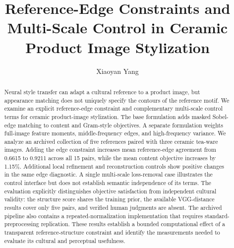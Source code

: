 \documentclass[manuscript,acmlarge,screen,review]{acmart}
\begin{document}
\title{Reference-Edge Constraints and Multi-Scale Control in Ceramic Product Image Stylization}

\author{Xiaoyan Yang}


\begin{abstract}
Neural style transfer can adapt a cultural reference to a product image, but appearance matching does not uniquely specify the contours of the reference motif. We examine an explicit reference-edge constraint and complementary multi-scale control terms for ceramic product-image stylization. The base formulation adds masked Sobel-edge matching to content and Gram-style objectives. A separate formulation weights full-image feature moments, middle-frequency edges, and high-frequency variance. We analyze an archived collection of five references paired with three ceramic tea-ware images. Adding the edge constraint increases mean reference-edge agreement from 0.6615 to 0.9211 across all 15 pairs, while the mean content objective increases by 1.15\%. Additional local refinement and reconstruction controls show positive changes in the same edge diagnostic. A single multi-scale loss-removal case illustrates the control interface but does not establish semantic independence of its terms. The evaluation explicitly distinguishes objective satisfaction from independent cultural validity: the structure score shares the training prior, the available VGG-distance results cover only five pairs, and verified human judgments are absent. The archived pipeline also contains a repeated-normalization implementation that requires standard-preprocessing replication. These results establish a bounded computational effect of a transparent reference-structure constraint and identify the measurements needed to evaluate its cultural and perceptual usefulness.
\end{abstract}


\maketitle
\end{document}
